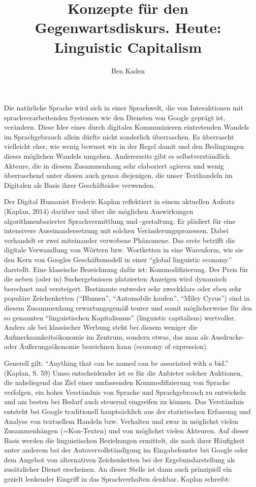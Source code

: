 \documentclass[a4paper,
fontsize=11pt,
oneside,
numbers=noperiodatend,
parskip=half-,
bibliography=totoc,
final
]{scrartcl}
\title{\LARGE{Konzepte für den Gegenwartsdiskurs. Heute: Linguistic Capitalism}} %
\author{Ben Kaden} %
\date{}
\begin{document}
\maketitle
\thispagestyle{fancyplain} 


Die natürliche Sprache wird sich in einer Sprachwelt, die von
Interaktionen mit sprachverarbeitenden Systemen wie den Diensten von
Google geprägt ist, verändern. Diese Idee eines durch digitales
Kommunizieren eintretenden Wandels im Sprachgebrauch allein dürfte nicht
sonderlich überraschen. Es überrascht vielleicht eher, wie wenig bewusst
wir in der Regel damit und den Bedingungen dieses möglichen Wandels
umgehen. Andererseits gibt es selbstverständlich Akteure, die in diesem
Zusammenhang sehr elaboriert agieren und wenig überraschend unter diesen
auch genau diejenigen, die unser Texthandeln im Digitalen als Basis
ihrer Geschäftsidee verwenden.

Der Digital Humanist Frederic Kaplan reflektiert in einem aktuellen
Aufsatz (Kaplan, 2014) darüber und über die möglichen Auswirkungen
algorithmenbasierter Sprachvermittlung und -gestaltung. Er plädiert für
eine intensivere Auseinandersetzung mit solchen Veränderungsprozessen.
Dabei verhandelt er zwei miteinander verwobene Phänomene. Das erste
betrifft die digitale Verwandlung von Wörtern bzw. Wortketten in eine
Warenform, wie sie den Kern von Googles Geschäftsmodell in einer
\enquote{global linguistic economy} darstellt. Eine klassische
Bezeichnung dafür ist: Kommodifizierung. Der Preis für die neben (oder
in) Suchergebnissen platzierten Anzeigen wird dynamisch berechnet und
versteigert. Bestimmte entweder sehr zweckklare oder eben sehr populäre
Zeichenketten (\enquote{Blumen}, \enquote{Automobile kaufen},
\enquote{Miley Cyrus}) sind in diesem Zusammenhang erwartungsgemäß
teurer und somit möglicherweise für den so genannten
\enquote{linguistischen Kapitalismus} (linguistic capitalism)
wertvoller. Anders als bei klassischer Werbung steht bei diesem weniger
die Aufmerksamkeitsökonomie im Zentrum, sondern etwas, das man als
Ausdrucks- oder Äußerungsökonomie bezeichnen kann (economy of
expression).

Generell gilt: \enquote{Anything that can be named can be associated
with a bid.} (Kaplan, S. 59) Umso entscheidender ist es für die Anbieter
solcher Auktionen, die naheliegend das Ziel einer umfassenden
Kommodifizierung von Sprache verfolgen, ein hohes Verständnis von
Sprache und Sprachgebrauch zu entwickeln und am besten bei Bedarf auch
steuernd eingreifen zu können. Das Verständnis entsteht bei Google
traditionell hauptsächlich aus der statistischen Erfassung und Analyse
von textuellem Handeln bzw. Verhalten und zwar in möglichst vielen
Zusammenhängen (=Kon-Texten) und von möglichst vielen Akteuren. Auf
dieser Basis werden die linguistischen Beziehungen ermittelt, die nach
ihrer Häufigkeit unter anderem bei der Autovervollständigung im
Eingabefenster bei Google oder dem Angebot von alternativen
Zeichenketten bei der Ergebnisdarstellung als zusätzlicher Dienst
erscheinen. An dieser Stelle ist dann auch prinzipiell ein gezielt
lenkender Eingriff in das Sprachverhalten denkbar. Kaplan schreibt:
\end{document}
